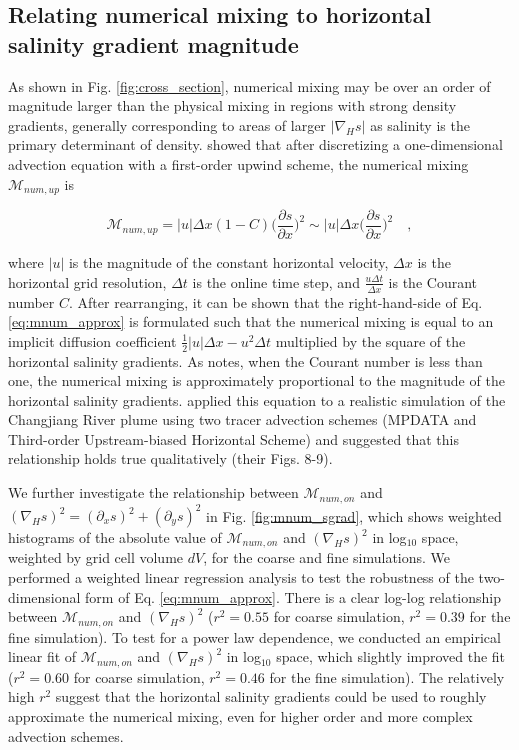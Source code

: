 \documentclass[draft]{agujournal2019}
\begin{document}
\subsection{Relating numerical mixing to horizontal salinity gradient magnitude} \label{sec:salinity_gradient_mag}

As shown in Fig. \ref{fig:cross_section}, numerical mixing may be over an order of magnitude larger than the physical mixing in regions with strong density gradients, generally corresponding to areas of larger $|\nabla_H s|$ as salinity is the primary determinant of density.  showed that after discretizing a one-dimensional advection equation with a first-order upwind scheme, the numerical mixing $\mathcal{M}_{num, up}$ is
\begin{linenomath*}
\begin{equation} \label{eq:mnum_approx}
    \mathcal{M}_{num, up} = |u|\Delta x (1-C) \bigg(\frac{\partial s}{\partial x} \bigg)^2 \sim |u|\Delta x \bigg(\frac{\partial s}{\partial x} \bigg)^2 \quad ,
\end{equation}
\end{linenomath*}
where $|u|$ is the magnitude of the constant horizontal velocity, $\Delta x$ is the horizontal grid resolution, $\Delta t$ is the online time step, and $\frac{u \Delta t}{\Delta x}$ is the Courant number $C$. After rearranging, it can be shown that the right-hand-side of Eq. \ref{eq:mnum_approx} is formulated such that the numerical mixing is equal to an implicit diffusion coefficient $\frac{1}{2}|u|\Delta x-u^2 \Delta t$ multiplied by the square of the horizontal salinity gradients. As  notes, when the Courant number is less than one, the numerical mixing is approximately proportional to the magnitude of the horizontal salinity gradients.  applied this equation to a realistic simulation of the Changjiang River plume using two tracer advection schemes (MPDATA and Third-order Upstream-biased Horizontal Scheme) and suggested that this relationship holds true qualitatively (their Figs. 8-9). 

We further investigate the relationship between $\mathcal{M}_{num, on}$ and $(\nabla_H s)^2 = (\partial_x s)^2+(\partial_y s)^2$ in Fig. \ref{fig:mnum_sgrad}, which shows weighted histograms of the absolute value of $\mathcal{M}_{num, on}$ and $(\nabla_H s)^2$ in log$_{10}$ space, weighted by grid cell volume $dV$, for the coarse and fine simulations. We performed a weighted linear regression analysis to test the robustness of the two-dimensional form of Eq. \ref{eq:mnum_approx}. There is a clear log-log relationship between $\mathcal{M}_{num, on}$ and $(\nabla_H s)^2$ ($r^2=0.55$ for coarse simulation, $r^2=0.39$ for the fine simulation). To test for a power law dependence, we conducted an empirical linear fit of $\mathcal{M}_{num, on}$ and $(\nabla_H s)^2$ in log$_{10}$ space, which slightly improved the fit ($r^2=0.60$ for coarse simulation, $r^2=0.46$ for the fine simulation). The relatively high $r^2$ suggest that the horizontal salinity gradients could be used to roughly approximate the numerical mixing, even for higher order and more complex advection schemes.
\end{document}
